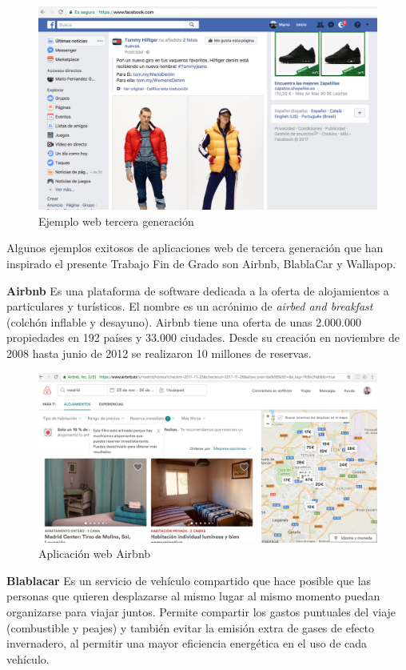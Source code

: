 \begin{figure}[!h]
    \centering
    \includegraphics[width=140mm]{img/introduccion/facebook.png}
    \caption{Ejemplo web tercera generación}
\end{figure}

Algunos ejemplos exitosos de aplicaciones web de tercera generación que han inspirado el presente Trabajo Fin de Grado son Airbnb, BlablaCar y Wallapop.

\textbf {Airbnb} Es una plataforma de software dedicada a la oferta de alojamientos a particulares y turísticos. El nombre es un acrónimo de \textit{airbed and breakfast} (colchón inflable y desayuno). Airbnb tiene una oferta de unas 2.000.000 propiedades en 192 países y 33.000 ciudades. Desde su creación en noviembre de 2008 hasta junio de 2012 se realizaron 10 millones de reservas.

\begin{figure}[!h]
    \centering
    \includegraphics[width=140mm]{img/introduccion/airbnb.png}
    \caption{Aplicación web Airbnb}
\end{figure}

\textbf {Blablacar} Es un servicio de vehículo compartido que hace posible que las personas que quieren desplazarse al mismo lugar al mismo momento puedan organizarse para viajar juntos. Permite compartir los gastos puntuales del viaje (combustible y peajes) y también evitar la emisión extra de gases de efecto invernadero, al permitir una mayor eficiencia energética en el uso de cada vehículo.

